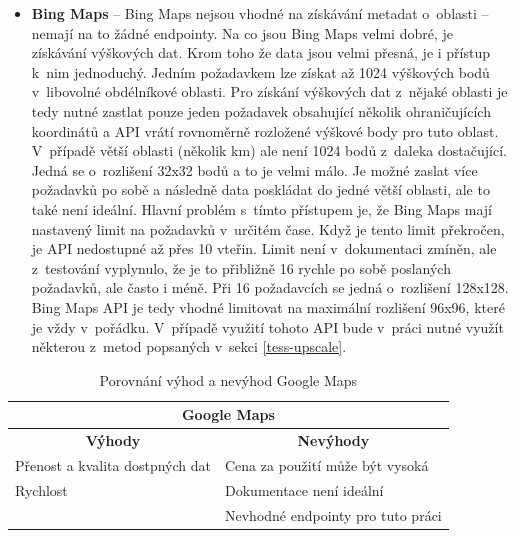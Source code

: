 \begin{itemize}
    \item \textbf{Bing Maps} -- Bing Maps nejsou vhodné na získávání metadat o~oblasti -- nemají na to žádné endpointy. Na co jsou Bing Maps velmi dobré, je získávání výškových dat. Krom toho že data jsou velmi přesná, je i přístup k~nim jednoduchý. Jedním požadavkem lze získat až 1024 výškových bodů v~libovolné obdélníkové oblasti. Pro získání výškových dat z~nějaké oblasti je tedy nutné zastlat pouze jeden požadavek obsahující několik ohraničujících koordinátů a API vrátí rovnoměrně rozložené výškové body pro tuto oblast. V~případě větší oblasti (několik km) ale není 1024 bodů z~daleka dostačující. Jedná se o~rozlišení 32x32 bodů a to je velmi málo. Je možné zaslat více požadavků po sobě a následně data poskládat do jedné větší oblasti, ale to také není ideální. Hlavní problém s~tímto přístupem je, že Bing Maps mají nastavený limit na požadavků v~určitém čase. Když je tento limit překročen, je API nedostupné až přes 10 vteřin. Limit není v~dokumentaci zmíněn, ale z~testování vyplynulo, že je to přibližně 16 rychle po sobě poslaných požadavků, ale často i méně. Při 16 požadavcích se jedná o~rozlišení 128x128. Bing Maps API je tedy vhodné limitovat na maximální rozlišení 96x96, které je vždy v~pořádku. V~případě využití tohoto API bude v~práci nutné využít některou z~metod popsaných v~sekci \ref{tess-upscale}.

\end{itemize}

    \begin{table}[h]
    \centering
    \begin{tabular}{| m{18em} | m{18em}|}
    \hline
    \multicolumn{2}{|c|}{\textbf{Google Maps}}                                                \\ \hline
    \multicolumn{1}{|c|}{\textbf{Výhody}}              & \multicolumn{1}{c|}{\textbf{Nevýhody}} \\ \hline
    \multicolumn{1}{|l|}{Přenost a kvalita dostpných dat} & Cena za použití může být vysoká           \\ \hline
    \multicolumn{1}{|l|}{Rychlost} & Dokumentace není ideální    \\ \hline
    \multicolumn{1}{|l|}{}  & Nevhodné endpointy pro tuto práci   \\ \hline
    \end{tabular}
    \caption{Porovnání výhod a nevýhod Google Maps}
    \label{table:gmaps}
    \end{table}

